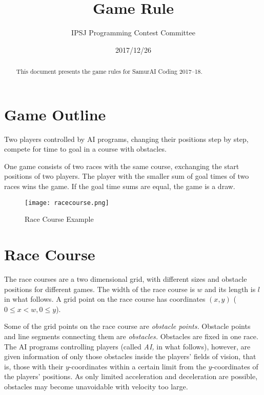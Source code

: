 \documentclass[11pt]{article}
\title{{\gamename} Game Rule}
\author{IPSJ Programming Contest Committee}
\date{2017/12/26}
\begin{document}
\maketitle

\begin{abstract}
  This document presents the game rules for SamurAI Coding 2017--18.
\end{abstract}

\section{Game Outline}
Two players controlled by AI programs, changing their positions step
by step, compete for time to goal in a course with obstacles.

One game consists of two races with the same course, exchanging the
start positions of two players.
The player with the smaller sum of goal times of two races wins the game.
If the goal time sums are equal, the game is a draw.

\begin{wrapfigure}{r}{0.38\columnwidth}
  \vspace{-2cm}
  \centering
  \texttt{[image: racecourse.png]}
  \caption{Race Course Example}
  \label{fig:course}
\end{wrapfigure}

\section{Race Course}
The race courses are a two dimensional grid, with different sizes and
obstacle positions for different games.  The width of the race course is
$w$ and its length is $l$ in what follows.  A grid point on the race
course has coordinates $(x,y)$ ($0\le x < w, 0\le y$).

Some of the grid points on the race course are {\em obstacle points.}
Obstacle points and line segments connecting them are {\em obstacles.}
Obstacles are fixed in one race.  The AI programs controlling players
(called {\em AI,} in what follows), however, are given information of
only those obstacles inside the players' fields of vision, that is,
those with their $y$-coordinates within a certain limit from the
$y$-coordinates of the players' positions.  As only limited
acceleration and deceleration are possible, obstacles may become
unavoidable with velocity too large.
\end{document}
